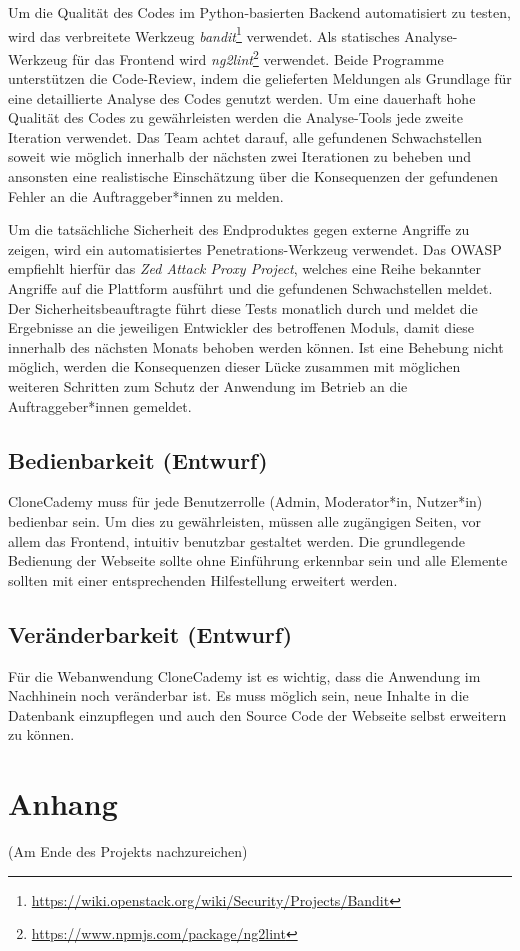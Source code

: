 \documentclass[accentcolor=tud0b,12pt,paper=a4]{tudreport}
\begin{document}
Um die Qualität des Codes im Python-basierten Backend automatisiert zu testen, wird das verbreitete Werkzeug \emph{bandit}\footnote{\href{https://wiki.openstack.org/wiki/Security/Projects/Bandit}{https://wiki.openstack.org/wiki/Security/Projects/Bandit}} verwendet. Als statisches Analyse-Werkzeug für das Frontend wird \emph{ng2lint}\footnote{\href{https://www.npmjs.com/package/ng2lint}{https://www.npmjs.com/package/ng2lint}} verwendet. Beide Programme unterstützen die Code-Review, indem die gelieferten Meldungen als Grundlage für eine detaillierte Analyse des Codes genutzt werden. Um eine dauerhaft hohe Qualität des Codes zu gewährleisten werden die Analyse-Tools jede zweite Iteration verwendet. Das Team achtet darauf, alle gefundenen Schwachstellen soweit wie möglich innerhalb der nächsten zwei Iterationen zu beheben und ansonsten eine realistische Einschätzung über die Konsequenzen der gefundenen Fehler an die Auftraggeber*innen zu melden.

Um die tatsächliche Sicherheit des Endproduktes gegen externe Angriffe zu zeigen, wird ein automatisiertes Penetrations-Werkzeug verwendet. Das OWASP empfiehlt hierfür das \emph{Zed Attack Proxy Project}, welches eine Reihe bekannter Angriffe auf die Plattform ausführt und die gefundenen Schwachstellen meldet. Der Sicherheitsbeauftragte führt diese Tests monatlich durch und meldet die Ergebnisse an die jeweiligen Entwickler des betroffenen Moduls, damit diese innerhalb des nächsten Monats behoben werden können. Ist eine Behebung nicht möglich, werden die Konsequenzen dieser Lücke zusammen mit möglichen weiteren Schritten zum Schutz der Anwendung im Betrieb an die Auftraggeber*innen gemeldet.

\section{Bedienbarkeit (Entwurf)}
CloneCademy muss für jede Benutzerrolle (Admin, Moderator*in, Nutzer*in) bedienbar sein. Um dies zu gewährleisten, müssen alle zugängigen Seiten, vor allem das Frontend, intuitiv benutzbar gestaltet werden. Die grundlegende Bedienung der Webseite sollte ohne Einführung erkennbar sein und alle Elemente sollten mit einer entsprechenden Hilfestellung erweitert werden.

\section{Veränderbarkeit (Entwurf)}
Für die Webanwendung CloneCademy ist es wichtig, dass die Anwendung im Nachhinein noch veränderbar ist. Es muss möglich sein, neue Inhalte in die Datenbank einzupflegen und auch den Source Code der Webseite selbst erweitern zu können.




\appendix
	\chapter{Anhang}
		(Am Ende des Projekts nachzureichen)\\
\end{document}
